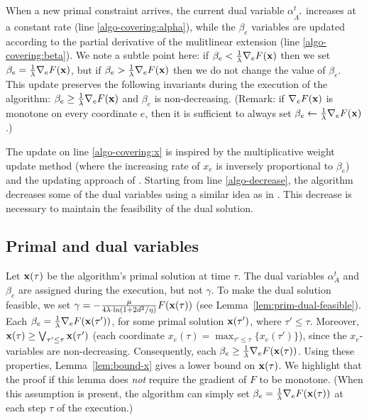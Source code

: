 When a new primal constraint arrives, the current dual variable $\alpha^{t}_{A^*}$ increases at a constant rate (line \ref{algo-covering:alpha}), while the $\beta_e$ variables are updated according to the partial derivative of the mulitlinear extension (line \ref{algo-covering:beta}). We note a subtle point here: if $\beta_e < \frac{1}{\lambda} \nabla_{e} F(\mathbf{x})$ then we set
$\beta_e = \frac{1}{\lambda} \nabla_{e} F(\mathbf{x})$, but if $\beta_e > \frac{1}{\lambda} \nabla_{e} F(\mathbf{x})$ then we do not change the value of $\beta_e$. This update preserves the following invariants during the execution of the algorithm: $\beta_{e} \geq \frac{1}{\lambda} \nabla_{e} F(\mathbf{x})$ and $\beta_{e}$ is non-decreasing. (Remark: if $\nabla_{e} F(\mathbf{x})$ is monotone on every coordinate $e$, then it is sufficient to always set $\beta_{e} \gets \frac{1}{\lambda} \nabla_{e} F(\mathbf{x})$.)

The update on line \ref{algo-covering:x} is inspired by the multiplicative weight update method (where the increasing rate of $x_{e}$
is inversely proportional to $\beta_{e}$) and the updating approach of \cite{BamasMaggiori20:The-Primal-Dual-method}.
Starting from line \ref{algo-decrease}, the algorithm decreases some of the dual variables using a similar idea as in
\cite{AzarBuchbinder16:Online-Algorithms}. This decrease is necessary to maintain the feasibility of the dual solution.


\subsection{Primal and dual variables}
Let $\mathbf{x}(\tau)$ be the algorithm's primal solution at time $\tau$. The dual variables $\alpha^{t}_{A}$ and $\beta_{e}$ are assigned during the execution, but not $\gamma$. To make the dual solution feasible, we set $\gamma = -\frac{\mu}{4\lambda \cdot \ln(1+2d^{2}/\eta)} F(\mathbf{x}(\tau))$ (see Lemma~\ref{lem:prim-dual-feasible}). Each $\beta_{e} = \frac{1}{\lambda} \nabla_{e} F(\mathbf{x}(\tau'))$, for some primal solution $\mathbf{x}(\tau')$, where $\tau' \le \tau$. Moreover, $\mathbf{x}(\tau) \geq \bigvee_{\tau' \le \tau} \mathbf{x}(\tau')$ (each coordinate $x_{e}(\tau) = \max_{\tau' \le \tau}\{x_{e}(\tau')\}$), since the $x_e$-variables are non-decreasing. Consequently, each $\beta_{e} \geq \frac{1}{\lambda} \nabla_{e} F(\mathbf{x}(\tau))$. Using these properties, Lemma~\ref{lem:bound-x} gives a lower bound on $\mathbf{x}(\tau)$. We highlight that the proof if this lemma does \emph{not} require the gradient of $F$ to be monotone.
(When this assumption is present, the algorithm can simply set $\beta_{e} = \frac{1}{\lambda} \nabla_{e} F(\mathbf{x}(\tau))$ at each step $\tau$ of the execution.)


